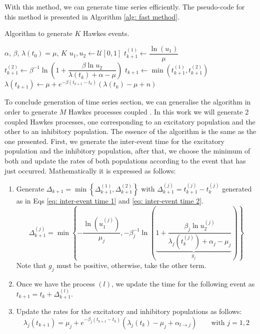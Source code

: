 With this method, we can generate time series efficiently. The pseudo-code for this method is presented in Algorithm \ref{alg: fast method}.
\begin{algorithm}
    \caption{Algorithm to generate $K$ Hawkes events.}\label{alg: fast method}
    \begin{algorithmic}
        \Require $\alpha$, $\beta$, $\lambda(t_0)=\mu$, $K$
            \State $u_1,u_2 \gets \mathcal{U}[0,1]$
            \State $t_{k+1}^{(1)}\gets \dfrac{\ln(u_1)}{\mu}$
            \State $t_{k+1}^{(2)} \gets \beta^{-1}\ln\left( 1+\dfrac{\beta\ln u_2}{\lambda(t_k)+\alpha-\mu} \right)$
            \State $t_{k+1} \gets \min\left( t_{k+1}^{(1)},t_{k+1}^{(2)} \right)$
            \State $\lambda(t_{k+1}) \gets \mu + e^{-\beta(t_{k+1}-t_k)}\left( \lambda(t_k)-\mu+n \right)$
        \EndFor
    \end{algorithmic}
\end{algorithm}

To conclude generation of time series section, we can generalise the algorithm in order to generate $M$ Hawkes processes coupled \cite{dassios2013exact,laub2021elements}. 
In this work we will generate 2 coupled Hawkes processes, one corresponding to an excitatory population and the other to an inhibitory population. The essence of the algorithm is the 
same as the one presented. First, we generate the inter-event time for the excitatory population and the inhibitory population, after that, we choose the minimum of both and update the
rates of both populations according to the event that has just occurred. Mathematically it is expressed as follows:

\begin{enumerate}
    \item Generate $\Delta_{k+1} = \min\left\{ \Delta_{k+1}^{(1)},\Delta_{k+1}^{(2)} \right\}$ with $\Delta_{k+1}^{(j)}=t_{k+1}^{(j)}-t_k^{(j)}$ generated 
    as in Eqs \ref{eq: inter-event time 1} and \ref{eq: inter-event time 2}.
    \begin{equation}
        \Delta_{k+1}^{(j)} = \min \left\{ -\dfrac{\ln(u_1^{(j)})}{\mu_j},-\beta_j^{-1}\ln\left( \underbrace{1+\dfrac{\beta_j\ln u_2^{(j)}}{\lambda_j\left( t_k^{(j)} \right)+\alpha_j-\mu_j}}_{g_j} \right) \right\}
        \label{eq: inter-event time coupled}
    \end{equation}
    Note that $g_j$ must be positive, otherwise, take the other term.
    \item Once we have the process $(l)$, we update the time for the following event as $t_{k+1}=t_k+\Delta_{k+1}^{(l)}$.
    \item Update the rates for the excitatory and inhibitory populations as follows:
    \begin{equation}
        \lambda_j(t_{k+1}) = \mu_j + e^{-\beta_j(t_{k+1}-t_k)}\left( \lambda_j(t_k)-\mu_j+\alpha_{l\to j} \right) \qquad \text{with } j=1,2
    \end{equation}
\end{enumerate}

